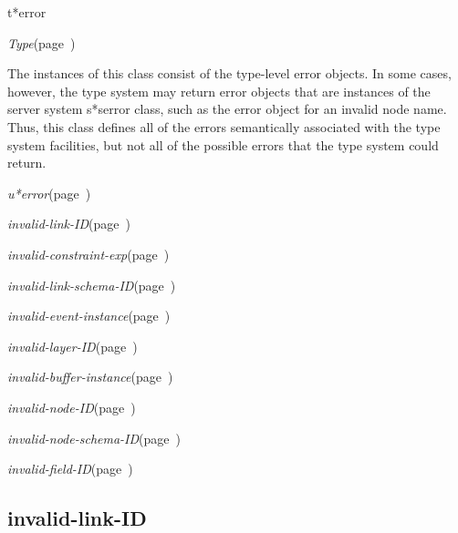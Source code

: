 \begin{description}
\item [Name:]  t*error

\item [Layer:] {\sl Type}\hfill(page~\pageref{Type})

\item [Description:]
The instances of this class consist of the type-level
error objects. In some cases, however, the type system
may return error objects that are instances of the 
server system s*serror class, such as the error object
for an invalid node name. Thus, this class defines 
all of the errors semantically associated with the
type system facilities, but not all of the possible 
errors that the type system could return.

\item [Attributes:]

\item [Operations:]

\item [Subclasses:]

\item [Superclasses:]
\item {\sl u*error}\hfill(page~\pageref{u*error})

\item [Instances:]
\item {\sl invalid-link-ID}\hfill(page~\pageref{invalid-link-ID})
\item {\sl invalid-constraint-exp}\hfill(page~\pageref{invalid-constraint-exp})
\item {\sl invalid-link-schema-ID}\hfill(page~\pageref{invalid-link-schema-ID})
\item {\sl invalid-event-instance}\hfill(page~\pageref{invalid-event-instance})
\item {\sl invalid-layer-ID}\hfill(page~\pageref{invalid-layer-ID})
\item {\sl invalid-buffer-instance}\hfill(page~\pageref{invalid-buffer-instance})
\item {\sl invalid-node-ID}\hfill(page~\pageref{invalid-node-ID})
\item {\sl invalid-node-schema-ID}\hfill(page~\pageref{invalid-node-schema-ID})
\item {\sl invalid-field-ID}\hfill(page~\pageref{invalid-field-ID})




\end{description}
\horizontalline

\subsection{invalid-link-ID}
\label{invalid-link-ID}

